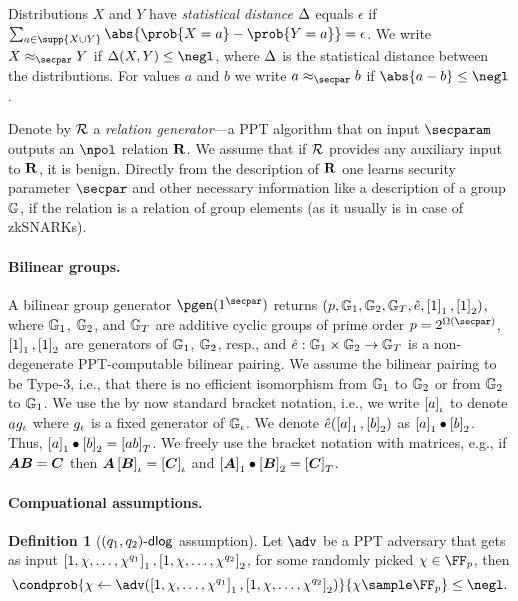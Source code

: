 \documentclass[runningheads,11pt]{llncs}
\let\spvec\vec
\let\vec\accentvec
\let\vec\spvec
\def\vec#1{\mathchoice{\mbox{\boldmath$\displaystyle#1$}}
	{\mbox{\boldmath$\textstyle#1$}}
	{\mbox{\boldmath$\scriptstyle#1$}}
	{\mbox{\boldmath$\scriptscriptstyle#1$}}}
\theoremstyle{definition}
\newtheorem{definition}[theorem]{Definition}
\begin{document}
Distributions $X$ and $Y$ have \emph{statistical distance} $\Delta$ equals $\epsilon$ if $\sum_{a \in \supp{X \cup Y}} \abs{\prob{X = a} - \prob{Y = a}} = \epsilon$.
We write $X \approx_\secpar Y$ if $\SD(X, Y) \leq \negl$, where $\Delta$ is the statistical distance between the distributions.
For values $a$ and $b$ we write $a \approx_\secpar b$ if $\abs{a - b} \leq \negl$.

Denote by $\mathcal{R}$ a \emph{relation generator}---a PPT algorithm that on input $\secparam$ outputs an $\npol$ relation $\mathbf{R}$. We assume that if $\mathcal{R}$ provides any auxiliary input to $\mathbf{R}$, it is benign. Directly from the description of $\mathbf{R}$ one learns security parameter $\secpar$ and other necessary information like a description of a group $\mathbb{G}$, if the relation is a relation of group elements (as it usually is in case of zkSNARKs).

\paragraph{Bilinear groups.}
A bilinear group generator $\pgen (1^\secpar)$ returns $(p, \mathbb{G}_1, \mathbb{G}_2, \mathbb{G}_T, \hat{e}, \left[1\right]_{1}, \left[1\right]_{2})$, where $\mathbb{G}_1$, $\mathbb{G}_2$, and $\mathbb{G}_T$ are additive cyclic groups of prime order $p = 2^{\Omega (\secpar)}$, $\left[1\right]_{1}, \left[1\right]_{2}$ are generators of $\mathbb{G}_1$, $\mathbb{G}_2$, resp., and $\hat{e}: \mathbb{G}_1 \times \mathbb{G}_2 \to \mathbb{G}_T$ is a non-degenerate PPT-computable bilinear pairing.
We assume the bilinear pairing to be Type-3, i.e., that there is no efficient isomorphism from $\mathbb{G}_1$ to $\mathbb{G}_2$ or from $\mathbb{G}_2$ to $\mathbb{G}_1$.
We use the by now standard bracket notation, i.e., we write $\left[a\right]_{\iota}$ to denote $a g_{\iota}$ where $g_{\iota}$ is a fixed generator of $\mathbb{G}_{\iota}$.
We denote $\hat{e} (\left[a\right]_{1}, \left[b\right]_{2})$ as $\left[a\right]_{1} \bullet \left[b\right]_{2}$.
Thus, $\left[a\right]_{1} \bullet \left[b\right]_{2} = \left[a b\right]_{T}$.
We freely use the bracket notation with matrices, e.g., if $\vec{A} \vec{B} = \vec{C}$ then $\vec{A} \grpgi{\vec{B}} = \grpgi{\vec{C}}$ and $\gone{\vec{A}}\bullet \gtwo{\vec{B}} = \gtar{\vec{C}}$.

\paragraph{Compuational assumptions.}

\begin{definition}[$(q_1, q_2)\text{-}\mathsf{dlog}$ assumption]
	Let $\adv$ be a PPT adversary that gets as input $\left[1, \chi, \ldots, \chi^{q_1}\right]_{1}, \left[1, \chi, \ldots, \chi^{q_2}\right]_{2}$, for some randomly picked $\chi \in \FF_p$, then
	\[
		\condprob{\chi \gets \adv(\gone{1, \chi, \ldots, \chi^{q_1}}, \gtwo{1, \chi, \ldots, \chi^{q_2} })}{\chi \sample \FF_p} \leq \negl.
	\]
\end{definition}
\end{document}
